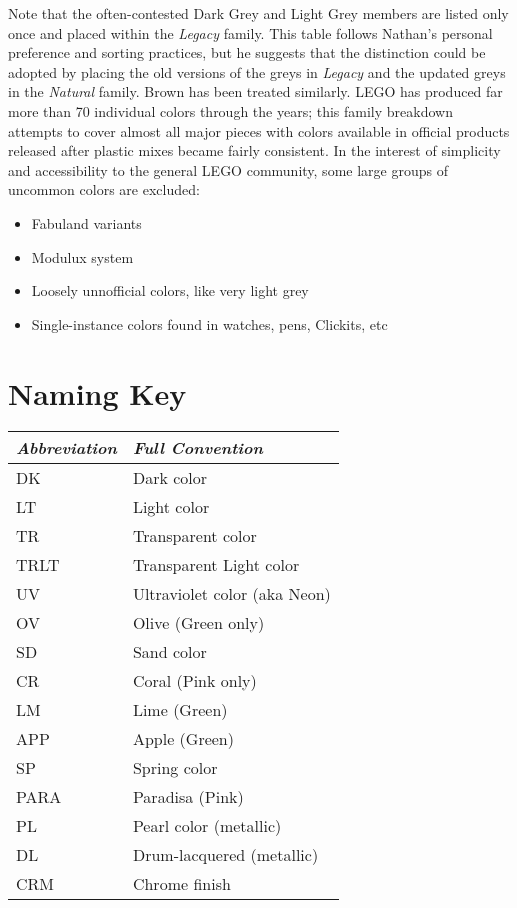\documentclass{article}
\begin{document}
Note that the often-contested Dark Grey and Light Grey members are listed only once and placed within the \textit{Legacy} family. This table follows Nathan's personal preference and sorting practices, but he suggests that the distinction could be adopted by placing the old versions of the greys in \textit{Legacy} and the updated greys in the \textit{Natural} family. Brown has been treated similarly.
\newline
\newline
LEGO\textsuperscript{\textregistered} has produced far more than 70 individual colors through the years; this family breakdown attempts to cover almost all major pieces with colors available in official products released after plastic mixes became fairly consistent. In the interest of simplicity and accessibility to the general LEGO\textsuperscript{\textregistered} community, some large groups of uncommon colors are excluded:
\begin{itemize}
    \item{Fabuland variants}
    \item{Modulux system}
    \item{Loosely unnofficial colors, like very light grey}
    \item{Single-instance colors found in watches, pens, Clickits, etc}
\end{itemize}

\section{Naming Key}

\begin{l}
\begin{tabular}{|| l | l ||} 
\hline
\textit{Abbreviation} & \textit{Full Convention} \\
\hline
\hline
DK & Dark color \\
\hline
LT & Light color \\
\hline
TR & Transparent color \\
\hline
TRLT & Transparent Light color \\
\hline
UV & Ultraviolet color (aka Neon) \\
\hline
OV & Olive (Green only) \\
\hline
SD & Sand color \\
\hline
CR & Coral (Pink only) \\
\hline
LM & Lime (Green) \\
\hline
APP & Apple (Green) \\
\hline
SP & Spring color \\
\hline
PARA & Paradisa (Pink) \\
\hline
PL & Pearl color (metallic) \\
\hline
DL & Drum-lacquered (metallic) \\
\hline
CRM & Chrome finish \\
\hline
\end{tabular}
\end{l}
\newline 
\end{document}
